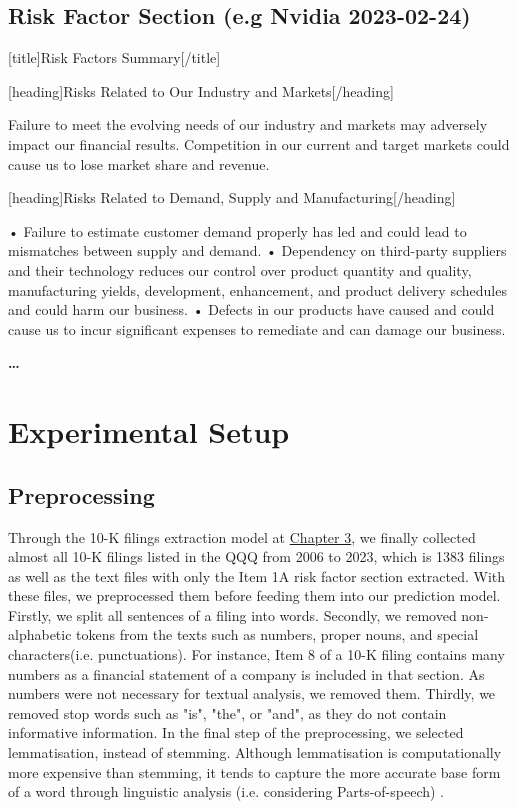 \documentclass[logo,bsc,singlespacing,parskip]{infthesis}
\begin{document}
\section{Risk Factor Section (e.g Nvidia 2023-02-24)}
\label{appendix_nvidia_risk}
[title]Risk Factors Summary[/title] 

[heading]Risks Related to Our Industry and Markets[/heading]

 Failure to meet the evolving needs of our industry and markets may adversely impact our financial results. Competition in our current and target markets could cause us to lose market share and revenue. 

[heading]Risks Related to Demand, Supply and Manufacturing[/heading]

 • Failure to estimate customer demand properly has led and could lead to mismatches between supply and demand. • Dependency on third-party suppliers and their technology reduces our control over product quantity and quality, manufacturing yields, development, enhancement, and product delivery schedules and could harm our business. • Defects in our products have caused and could cause us to incur significant expenses to remediate and can damage our business. 
\begin{center}
\textbf{…} 
\end{center}

\chapter{Experimental Setup}

\section{Preprocessing}

Through the 10-K filings extraction model at \hyperref[extraction-model]{Chapter 3}, we finally collected almost all 10-K filings listed in the QQQ from 2006 to 2023, which is 1383 filings as well as the text files with only the Item 1A risk factor section extracted. With these files, we preprocessed them before feeding them into our prediction model. Firstly, we split all sentences of a filing into words. Secondly, we removed non-alphabetic tokens from the texts such as numbers, proper nouns, and special characters(i.e. punctuations). For instance, Item 8 of a 10-K filing contains many numbers as a financial statement of a company is included in that section. As numbers were not necessary for textual analysis, we removed them. Thirdly, we removed stop words such as "is", "the", or "and", as they do not contain informative information.  In the final step of the preprocessing, we selected lemmatisation, instead of stemming. Although lemmatisation is computationally more expensive than stemming, it tends to capture the more accurate base form of a word through linguistic analysis (i.e. considering Parts-of-speech) \cite{AnalyticsVidhya2022}.
\end{document}

